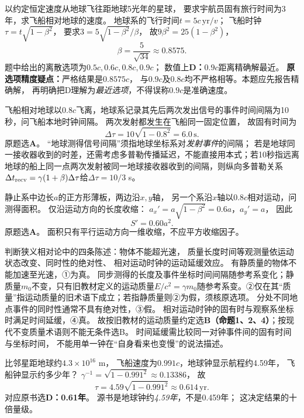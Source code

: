\problemtext 以约定恒定速度从地球飞往距地球5光年的星球，
要求宇航员固有旅行时间为3年，求飞船相对地球的速度。
\workings
地球系的飞行时间$t=5c\,\mathrm{yr}/v$；
飞船时钟$\tau=t\sqrt{1-\beta^2}$，
要求$3=5\sqrt{1-\beta^2}/\beta$，
故$9\beta^2=25(1-\beta^2)$，
\[
\boxed{\beta=\frac5{\sqrt{34}}\approx0.8575}.
\]
题中给出的离散选项为$0.5c,0.6c,0.8c,0.9c$；
数值上\textbf{D：$0.9c$}距离精确解最近。
\crosscheck \textbf{原选项精度疑点：}严格结果是$0.8575c$，
与$0.9c$及$0.8c$均不严格相等。本题应先报告精确解，
再明确把D理解为\emph{最近选项}，不得误称$0.9c$是准确速度。

\problemtext 飞船相对地球以$0.8c$飞离，地球系记录其先后两次发出信号的事件时间间隔为10秒，问飞船本地时钟间隔。
\workings
两次发射都发生在飞船同一固定位置，
故固有时间为
\[
\boxed{\Delta\tau=10\sqrt{1-0.8^2}=6.0\,\mathrm s}.
\]
原题选\textbf{A}。
\crosscheck “地球测得信号间隔”须指地球坐标系对\emph{发射事件}的间隔；
若是地球同一接收器收到的时差，还需考虑多普勒传播延迟，不能直接用本式；若10秒指远离地球的船上同一点两次发射被同一地球接收器收到的间隔，则纵向多普勒关系$\Delta t_{\rm recv}=\gamma(1+\beta)\Delta\tau$给$\Delta\tau=10/3$ s。

\problemtext 静止系中边长$a$的正方形薄板，两边沿$x,y$轴，
另一个系沿$x$轴以$0.8c$相对运动，问测得面积。
\workings
仅沿运动方向的长度收缩：
$a_x'=a\sqrt{1-\beta^2}=0.6a$，$a_y'=a$，
因此
\[
\boxed{S'=0.60a^2}.
\]
原题选\textbf{A}。
\crosscheck 面积只有平行运动方向一维收缩，不应平方收缩因子。

\problemtext 判断狭义相对论中的四条陈述：物体不能超光速，
质量长度时间等观测量依运动状态改变、同时性的绝对性、
相对运动时钟的运动延缓效应。
\workings
有静质量的物体不能加速至光速，①为真。
同步测得的长度及事件坐标时间间隔随参考系变化；静质量$m_0$不变，只有旧教材定义的运动质量$E/c^2=\gamma m_0$随参考系变。②仅在其“质量”指运动质量的旧术语下成立；若指静质量则②为假，须核原选项。
分处不同地点事件的同时性通常不具有绝对性，③假。
相对运动时钟的固有时与观察系坐标时满足时间延缓，④真。
故按旧教材的运动质量约定选\textbf{B（命题1、2、4）}；按现代不变质量术语则不能无条件选B。
\crosscheck 时间延缓需比较同一对钟事件间的固有时间与坐标时间，
不能用单一钟在“自身看来也变慢”的说法描述。

\problemtext 比邻星距地球约$4.3\times10^{16}$ m，
飞船速度为$0.991c$，地球钟显示航程约4.59年，
飞船钟显示约多少年？
\workings
$\gamma^{-1}=\sqrt{1-0.991^2}\approx0.13386$，
故
\[
\boxed{\tau=4.59\sqrt{1-0.991^2}\approx0.614\,\mathrm{yr}}.
\]
对应原书选\textbf{D：0.61年}。
\crosscheck 源书是地球钟约\emph{4.59年}，不是0.459年；
这决定结果的十倍量级。

